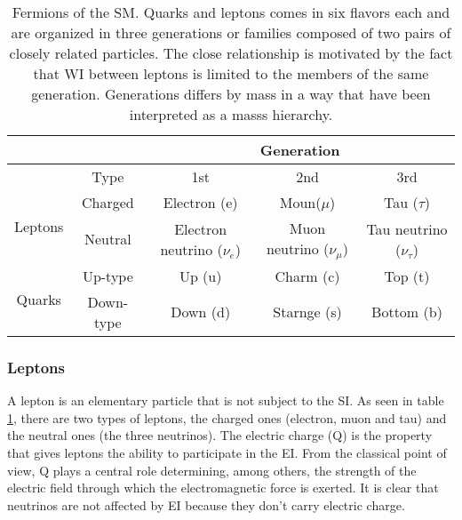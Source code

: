 \begin{center}
\begin{table}[h!]
\centering
\footnotesize
\begin{tabular}{ccccc} \hline
                         &         & \multicolumn{3}{c}{Generation}                                                           \\ \hline
                         &Type     & 1st                          & 2nd                        & 3rd                          \\ \hline
\multirow{2}{*}{Leptons} &Charged  & Electron (e)                 & Moun($\mu$)                & Tau ($\tau$)                 \\%
                         &Neutral  & Electron neutrino ($\nu_e$)  & Muon neutrino ($\nu_{\mu}$) & Tau neutrino ($\nu_{\tau}$) \\\hline
\multirow{2}{*}{Quarks}  &Up-type  & Up (u)                       & Charm (c)                & Top (t)                        \\%
                         &Down-type& Down (d)                     & Starnge (s)              & Bottom (b)                     \\\hline
\end{tabular}
\caption[Fermions of the SM.]{Fermions of the SM. Quarks and leptons comes in six flavors each and are organized in three generations or families composed of two pairs of closely related particles. The close relationship is motivated by the fact that WI between leptons is limited to the members of the same generation. Generations differs by mass in a way that have been interpreted as a masss hierarchy.}\label{flav_gen}
\end{table}
\end{center}

\subsubsection{Leptons}

\noindent A lepton is an elementary particle that is not subject to the SI. As seen in table \ref{flav_gen}, there are two types of leptons, the charged ones (electron, muon and tau) and the neutral ones (the three neutrinos). The electric charge (Q) is the property that gives leptons the ability to participate in the EI. From the classical point of view, Q plays a central role determining, among others, the strength of the electric field through which the electromagnetic force is exerted. It is clear that neutrinos are not affected by EI because they don't carry electric charge.

